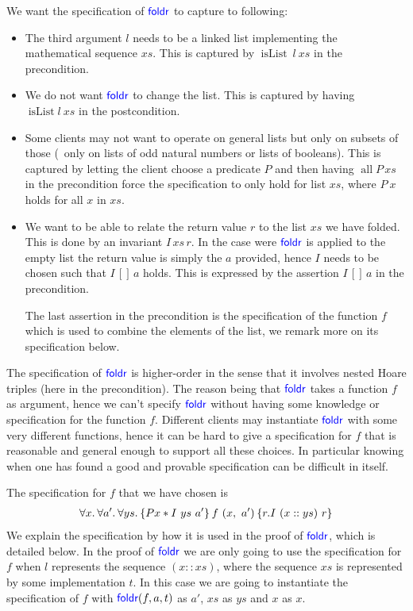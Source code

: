 We want the specification of $\textsf{\color{blue} foldr}$ to capture to following:
\begin{itemize}
\item The third argument $l$ needs to be a linked list implementing the mathematical sequence $xs$.
  This is captured by $\operatorname{isList} \ l \ xs$ in the precondition.
\item We do not want $\textsf{\color{blue} foldr}$ to change the list.
  This is captured by having $\operatorname{isList} l \ xs$ in the postcondition.
\item Some clients may not want to operate on general lists but only on subsets of those (\eg{}~only on lists of odd natural numbers or lists of booleans).
  This is captured by letting the client choose a predicate $P$ and then having $\operatorname{all} P\, xs$ in the precondition force the specification to only hold for list $xs$, where $P \ x$ holds for all $x$ in $xs$.
\item We want to be able to relate the return value $r$ to the list $xs$ we have folded.
  This is done by an invariant $I\, xs\, r$.
  In the case were $\textsf{\color{blue} foldr}$ is applied to the empty list the return value is simply the $a$ provided, hence $I$ needs to be chosen such that $I \, [] \, a$ holds.
  This is expressed by the assertion $I\, []\, a$ in the precondition.

  The last assertion in the precondition is the specification of the function $f$ which is used to combine the elements of the list, we remark more on its specification below.
\end{itemize}
The specification of $\textsf{\color{blue} foldr}$ is higher-order in the sense that it involves nested Hoare triples (here in the precondition).
The reason being that $\textsf{\color{blue} foldr}$ takes a function $f$ as argument, hence we can't specify $\textsf{\color{blue} foldr}$ without having some knowledge or specification for the function $f$.
Different clients may instantiate $\textsf{\color{blue} foldr}$ with some very different functions, hence it can be hard to give a specification for $f$ that is reasonable and general enough to support all these choices.
In particular knowing when one has found a good and provable specification can be difficult in itself.

The specification for $f$ that we have chosen is
\begin{align*}
\All x. \All a'. \All ys. \hoare{P x \ast I \ ys \ a'}{f \ (x, \ a')}{r. I\ (x::ys)\   r}
\end{align*}
We explain the specification by how it is used in the proof of $\textsf{\color{blue} foldr}$, which is detailed below.
In the proof of $\textsf{\color{blue} foldr}$ we are only going to use the specification for $f$ when $l$ represents the sequence $(x::xs)$, where the sequence $xs$ is represented by some implementation $t$.
In this case we are going to instantiate the specification of $f$ with $\textsf{\color{blue} foldr}(f, a, t)$ as $a'$, $xs$ as $ys$ and $x$ as $x$.

